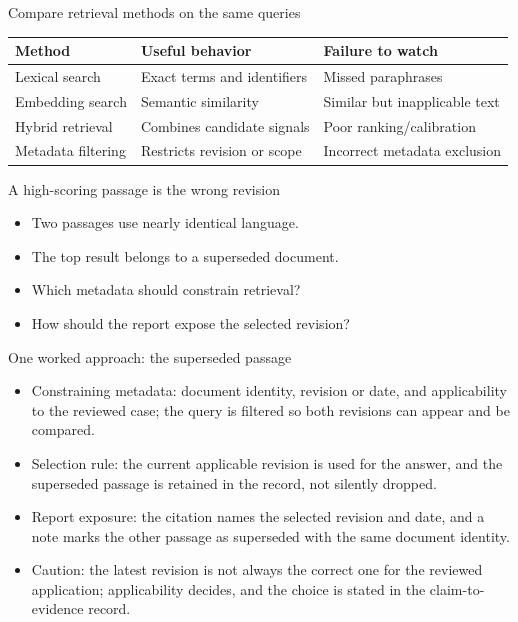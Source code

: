 \documentclass[aspectratio=169,11pt]{beamer}
\begin{document}
\begin{frame}[t,fragile]{Compare retrieval methods on the same queries}
\fontsize{10.5}{12.5}\selectfont\setlength{\tabcolsep}{4pt}\renewcommand{\arraystretch}{1.15}
\begin{tabular}{>{\raggedright\arraybackslash}p{}>{\raggedright\arraybackslash}p{}>{\raggedright\arraybackslash}p{}}
\toprule
\textbf{Method} & \textbf{Useful behavior} & \textbf{Failure to watch} \\ \midrule
Lexical search & Exact terms and identifiers & Missed paraphrases \\[2pt]
Embedding search & Semantic similarity & Similar but inapplicable text \\[2pt]
Hybrid retrieval & Combines candidate signals & Poor ranking/calibration \\[2pt]
Metadata filtering & Restricts revision or scope & Incorrect metadata exclusion \\[2pt]
\bottomrule\end{tabular}\par\vspace{2mm}
\end{frame}
\begin{frame}[t,fragile]{A high-scoring passage is the wrong revision}
\fontsize{11.5}{14}\selectfont
\begin{itemize}\setlength{\itemsep}{2mm}
\item Two passages use nearly identical language.
\item The top result belongs to a superseded document.
\item Which metadata should constrain retrieval?
\item How should the report expose the selected revision?
\end{itemize}
\end{frame}
\begin{frame}[t,fragile]{One worked approach: the superseded passage}
\fontsize{11.5}{14}\selectfont
\begin{itemize}\setlength{\itemsep}{2mm}
\item Constraining metadata: document identity, revision or date, and applicability to the reviewed case; the query is filtered so both revisions can appear and be compared.
\item Selection rule: the current applicable revision is used for the answer, and the superseded passage is retained in the record, not silently dropped.
\item Report exposure: the citation names the selected revision and date, and a note marks the other passage as superseded with the same document identity.
\item Caution: the latest revision is not always the correct one for the reviewed application; applicability decides, and the choice is stated in the claim-to-evidence record.
\end{itemize}
\end{frame}
\end{document}
